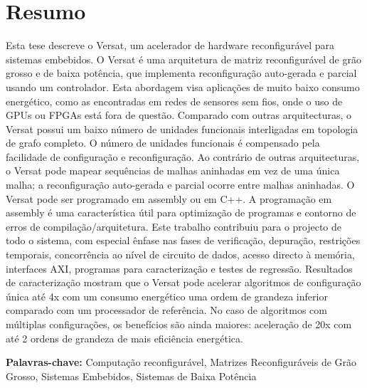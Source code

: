 
\section*{Resumo}


Esta tese descreve o Versat, um acelerador de hardware reconfigurável
para sistemas embebidos. O Versat é uma arquitetura de matriz
reconfigurável de grão grosso e de baixa potência, que implementa
reconfiguração auto-gerada e parcial usando um controlador. Esta
abordagem visa aplicações de muito baixo consumo energético, como as
encontradas em redes de sensores sem fios, onde o uso de GPUs ou FPGAs
está fora de questão. Comparado com outras arquitecturas, o Versat
possui um baixo número de unidades funcionais interligadas em
topologia de grafo completo. O número de unidades funcionais é
compensado pela facilidade de configuração e reconfiguração. Ao
contrário de outras arquitecturas, o Versat pode mapear sequências de
malhas aninhadas em vez de uma única malha; a reconfiguração
auto-gerada e parcial ocorre entre malhas aninhadas. O Versat pode ser
programado em assembly ou em C++. A programação em assembly é uma
característica útil para optimização de programas e contorno de erros
de compilação/arquitetura. Este trabalho contribuiu para o projecto de
todo o sistema, com especial ênfase nas fases de verificação,
depuração, restrições temporais, concorrência ao nível de circuito de
dados, acesso directo à memória, interfaces AXI, programas para
caracterização e testes de regressão. Resultados de caracterização
mostram que o Versat pode acelerar algoritmos de configuração única
até 4x com um consumo energético uma ordem de grandeza inferior
comparado com um processador de referência. No caso de algoritmos com
múltiplas configurações, os benefícios são ainda maiores: aceleração
de 20x com até 2 ordens de grandeza de mais eficiência energética.

\vfill

\textbf{\Large Palavras-chave:} Computação reconfigur{\'a}vel, Matrizes Reconfigur{\'a}veis de Gr{\~a}o Grosso, Sistemas Embebidos, Sistemas de Baixa Pot{\^e}ncia


